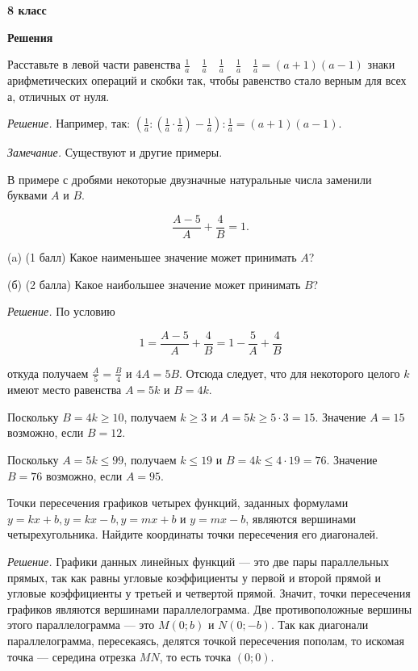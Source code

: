 \centerline{\bf \huge 8 класс}
\centerline{\bf \huge Решения}

Расставьте в левой части равенства $\frac{1}{a} \quad \frac{1}{a} \quad \frac{1}{a} \quad \frac{1}{a} \quad \frac{1}{a}=(a+1)(a-1)$ знаки арифметических операций и скобки так, чтобы равенство стало верным для всех а, отличных от нуля.

\textit{Решение.}
Например, так: $\left(\frac{1}{a}:\left(\frac{1}{a} \cdot \frac{1}{a}\right)-\frac{1}{a}\right): \frac{1}{a}=(a+1)(a-1)$.

\textit{Замечание.}
Существуют и другие примеры.

В примере с дробями некоторые двузначные натуральные числа заменили буквами $A$ и $B$.

$$
\frac{A-5}{A}+\frac{4}{B}=1 .
$$

(a) (1 балл) Какое наименьшее значение может принимать $A$?

(б) (2 балла) Какое наибольшее значение может принимать $B$?

\textit{Решение.} По условию

$$
1=\frac{A-5}{A}+\frac{4}{B}=1-\frac{5}{A}+\frac{4}{B}
$$


откуда получаем $\frac{A}{5}=\frac{B}{4}$ и $4 A=5 B$. Отсюда следует, что для некоторого целого $k$ имеют место равенства $A=5 k$ и $B=4 k$.

Поскольку $B=4 k \geqslant 10$, получаем $k \geqslant 3$ и $A=5 k \geqslant 5 \cdot 3=15$. Значение $A=15$ возможно, если $B=12$.

Поскольку $A=5 k \leqslant 99$, получаем $k \leqslant 19$ и $B=4 k \leqslant 4 \cdot 19=76$. Значение $B=76$ возможно, если $A=95$.

Точки пересечения графиков четырех функций, заданных формулами $y=k x+b, y=k x-b, y=m x+b$ и $y= m x-b$, являются вершинами четырехугольника. Найдите координаты точки пересечения его диагоналей.

\textit{Решение.}
Графики данных линейных функций --- это две пары параллельных прямых, так как равны угловые коэффициенты у первой и второй прямой и угловые коэффициенты у третьей и четвертой прямой. Значит, точки пересечения графиков являются вершинами параллелограмма. Две противоположные вершины этого параллелограмма --- это $M(0 ; b)$ и $N(0 ;-b)$. Так как диагонали параллелограмма, пересекаясь, делятся точкой пересечения пополам, то искомая точка --- середина отрезка $M N$, то есть точка $(0 ; 0)$.

